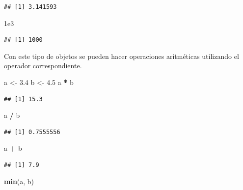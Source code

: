 \documentclass[]{book}
\newenvironment{Shaded}{\begin{snugshade}}{\end{snugshade}}
\newcommand{\KeywordTok}[1]{\textcolor[rgb]{0.13,0.29,0.53}{\textbf{#1}}}
\newcommand{\FloatTok}[1]{\textcolor[rgb]{0.00,0.00,0.81}{#1}}
\newcommand{\StringTok}[1]{\textcolor[rgb]{0.31,0.60,0.02}{#1}}
\newcommand{\OperatorTok}[1]{\textcolor[rgb]{0.81,0.36,0.00}{\textbf{#1}}}
\newcommand{\NormalTok}[1]{#1}
\begin{document}
\begin{verbatim}
## [1] 3.141593
\end{verbatim}

\begin{Shaded}
\begin{Highlighting}[]
\FloatTok{1e3}
\end{Highlighting}
\end{Shaded}

\begin{verbatim}
## [1] 1000
\end{verbatim}

Con este tipo de objetos se pueden hacer operaciones aritméticas
utilizando el operador correspondiente.

\begin{Shaded}
\begin{Highlighting}[]
\NormalTok{a <-}\StringTok{ }\FloatTok{3.4}
\NormalTok{b <-}\StringTok{ }\FloatTok{4.5}
\NormalTok{a }\OperatorTok{*}\StringTok{ }\NormalTok{b}
\end{Highlighting}
\end{Shaded}

\begin{verbatim}
## [1] 15.3
\end{verbatim}

\begin{Shaded}
\begin{Highlighting}[]
\NormalTok{a }\OperatorTok{/}\StringTok{ }\NormalTok{b}
\end{Highlighting}
\end{Shaded}

\begin{verbatim}
## [1] 0.7555556
\end{verbatim}

\begin{Shaded}
\begin{Highlighting}[]
\NormalTok{a }\OperatorTok{+}\StringTok{ }\NormalTok{b}
\end{Highlighting}
\end{Shaded}

\begin{verbatim}
## [1] 7.9
\end{verbatim}

\begin{Shaded}
\begin{Highlighting}[]
\KeywordTok{min}\NormalTok{(a, b)}
\end{Highlighting}
\end{Shaded}
\end{document}
